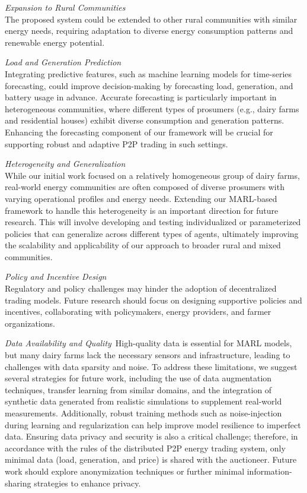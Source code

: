 \documentclass[preprint,12pt]{elsarticle}
\begin{document}
\textit{Expansion to Rural Communities}\\
The proposed system could be extended to other rural communities with similar energy needs, requiring adaptation to diverse energy consumption patterns and renewable energy potential.


\textit{Load and Generation Prediction}\\
Integrating predictive features, such as machine learning models for time-series forecasting, could improve decision-making by forecasting load, generation, and battery usage in advance. Accurate forecasting is particularly important in heterogeneous communities, where different types of prosumers (e.g., dairy farms and residential houses) exhibit diverse consumption and generation patterns. Enhancing the forecasting component of our framework will be crucial for supporting robust and adaptive P2P trading in such settings.

\textit{Heterogeneity and Generalization}\\
While our initial work focused on a relatively homogeneous group of dairy farms, real-world energy communities are often composed of diverse prosumers with varying operational profiles and energy needs. Extending our MARL-based framework to handle this heterogeneity is an important direction for future research. This will involve developing and testing individualized or parameterized policies that can generalize across different types of agents, ultimately improving the scalability and applicability of our approach to broader rural and mixed communities.

\textit{Policy and Incentive Design}\\
Regulatory and policy challenges may hinder the adoption of decentralized trading models. Future research should focus on designing supportive policies and incentives, collaborating with policymakers, energy providers, and farmer organizations.

\textit{Data Availability and Quality}\
High-quality data is essential for MARL models, but many dairy farms lack the necessary sensors and infrastructure, leading to challenges with data sparsity and noise. To address these limitations, we suggest several strategies for future work, including the use of data augmentation techniques, transfer learning from similar domains, and the integration of synthetic data generated from realistic simulations to supplement real-world measurements. Additionally, robust training methods such as noise-injection during learning and regularization can help improve model resilience to imperfect data. Ensuring data privacy and security is also a critical challenge; therefore, in accordance with the rules of the distributed P2P energy trading system, only minimal data (load, generation, and price) is shared with the auctioneer. Future work should explore anonymization techniques or further minimal information-sharing strategies to enhance privacy.
\end{document}
